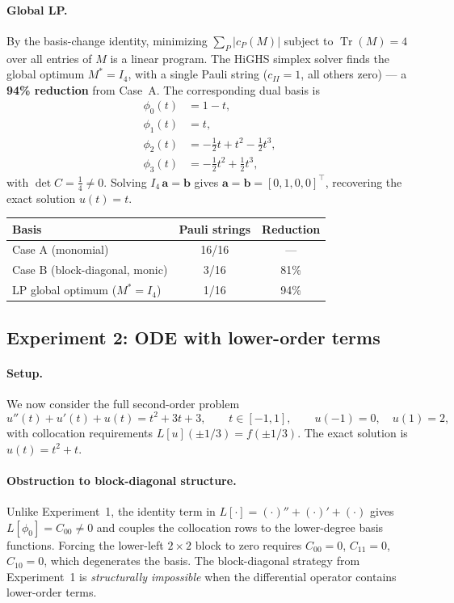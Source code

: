\documentclass[a4paper,12pt]{amsart}
\begin{document}
\paragraph{Global LP.}
By the basis-change identity, minimizing $\sum_P |c_P(M)|$ subject to $\operatorname{Tr}(M)=4$ over all entries of $M$ is a linear program. The HiGHS simplex solver finds the global optimum $M^* = I_4$, with a single Pauli string ($c_{II}=1$, all others zero) --- a \textbf{94\% reduction} from Case~A. The corresponding dual basis is
\begin{align*}
    \phi_0(t) &= 1 - t, \\
    \phi_1(t) &= t, \\
    \phi_2(t) &= -\tfrac{1}{2}t + t^2 - \tfrac{1}{2}t^3, \\
    \phi_3(t) &= -\tfrac{1}{2}t^2 + \tfrac{1}{2}t^3,
\end{align*}
with $\det C = \tfrac{1}{4} \neq 0$. Solving $I_4\,\mathbf{a}=\mathbf{b}$ gives $\mathbf{a}=\mathbf{b}=[0,1,0,0]^\top$, recovering the exact solution $u(t) = t$.

\begin{center}
\begin{tabular}{lcc}
\hline
Basis & Pauli strings & Reduction \\
\hline
Case A (monomial)              & 16/16 & --- \\
Case B (block-diagonal, monic) &  3/16 & 81\% \\
LP global optimum ($M^*=I_4$)  &  1/16 & 94\% \\
\hline
\end{tabular}
\end{center}

\subsection{Experiment 2: ODE with lower-order terms}

\paragraph{Setup.}
We now consider the full second-order problem
\begin{equation}
    u''(t) + u'(t) + u(t) = t^2 + 3t + 3, \qquad t \in [-1,1], \qquad u(-1)=0,\quad u(1)=2,
\end{equation}
with collocation requirements $L[u](\pm 1/3) = f(\pm 1/3)$. The exact solution is $u(t) = t^2 + t$.

\paragraph{Obstruction to block-diagonal structure.}
Unlike Experiment~1, the identity term in $L[\cdot] = (\cdot)'' + (\cdot)' + (\cdot)$ gives $L[\phi_0] = C_{00} \neq 0$ and couples the collocation rows to the lower-degree basis functions. Forcing the lower-left $2\times 2$ block to zero requires $C_{00}=0$, $C_{11}=0$, $C_{10}=0$, which degenerates the basis. The block-diagonal strategy from Experiment~1 is \emph{structurally impossible} when the differential operator contains lower-order terms.
\end{document}
